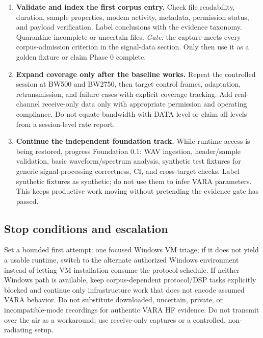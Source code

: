 \documentclass[11pt,a4paper]{article}
\begin{document}
\begin{enumerate}[leftmargin=*]
        single bandwidth setting (the guide suggests BW2300), exchange a
        short known text payload and a known binary payload, record both
        stations' audio in both directions, and preserve the application
        transcript and exact sent/received bytes. Confirm the session
        completed and payloads compare byte-for-byte before accepting the WAVs.
        Do not begin with rate sweeps or field transmissions.
        \emph{Gate:} at least one reproducible session, complete original audio
        from each direction, verified payloads, UTC capture time, source and
        setup notes, JSON sidecars, and SHA-256 hashes.
  \item \textbf{Validate and index the first corpus entry.} Check file
        readability, duration, sample properties, modem activity, metadata,
        permission status, and payload verification. Label conclusions with
        the evidence taxonomy. Quarantine incomplete or uncertain files.
        \emph{Gate:} the capture meets every corpus-admission criterion in the
        signal-data section. Only then use it as a golden fixture or claim
        Phase 0 complete.
  \item \textbf{Expand coverage only after the baseline works.} Repeat the
        controlled session at BW500 and BW2750, then target control frames,
        adaptation, retransmission, and failure cases with explicit coverage
        tracking. Add real-channel receive-only data only with appropriate
        permission and operating compliance. Do not equate bandwidth with
        DATA level or claim all levels from a session-level rate report.
  \item \textbf{Continue the independent foundation track.} While runtime
        access is being restored, progress Foundation 0.1: WAV ingestion,
        header/sample validation, basic waveform/spectrum analysis, synthetic
        test fixtures for generic signal-processing correctness, CI, and
        cross-target checks. Label synthetic fixtures as synthetic; do not
        use them to infer VARA parameters. This keeps productive work moving
        without pretending the evidence gate has passed.
\end{enumerate}

\subsection{Stop conditions and escalation}
Set a bounded first attempt: one focused Windows VM triage; if it does not
yield a usable runtime, switch to the alternate authorized Windows environment
instead of letting VM installation consume the protocol schedule. If neither
Windows path is available, keep corpus-dependent protocol/DSP tasks explicitly
blocked and continue only infrastructure work that does not encode assumed
VARA behavior. Do not substitute downloaded, uncertain, private, or
incompatible-mode recordings for authentic VARA HF evidence. Do not transmit
over the air as a workaround; use receive-only captures or a controlled,
non-radiating setup.
\end{document}
